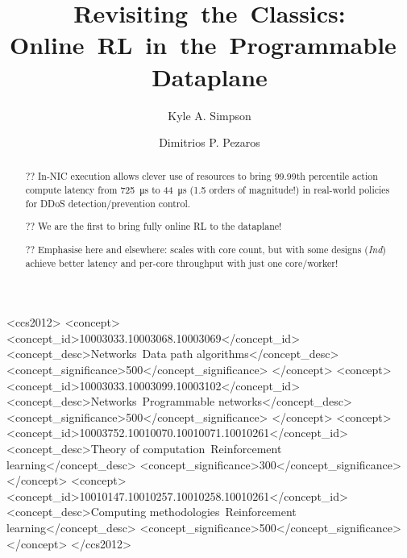 \documentclass[sigconf,natbib=false]{acmart}
\newcommand{\Indfw}{\emph{Ind}}
\begin{document}
	\title{Revisiting~the~Classics: Online~RL~in~the~Programmable~Dataplane}
	
	
	 \author{Kyle A. Simpson}
	 \author{Dimitrios P. Pezaros}
	
\renewcommand{\shortauthors}{Simpson \emph{et al}.}
	
\begin{abstract}
?? In-NIC execution allows clever use of resources to bring 99.99th percentile action compute latency  from \SI{725}{\micro\second} to \SI{44}{\micro\second} (1.5 orders of magnitude!) in real-world policies for DDoS detection/prevention control.

?? We are the first to bring fully online RL to the dataplane!

?? Emphasise here and elsewhere: scales with core count, but with some designs (\Indfw) achieve better latency and per-core throughput with just one core/worker!
\end{abstract}

\begin{CCSXML}
	<ccs2012>
	<concept>
	<concept_id>10003033.10003068.10003069</concept_id>
	<concept_desc>Networks~Data path algorithms</concept_desc>
	<concept_significance>500</concept_significance>
	</concept>
	<concept>
	<concept_id>10003033.10003099.10003102</concept_id>
	<concept_desc>Networks~Programmable networks</concept_desc>
	<concept_significance>500</concept_significance>
	</concept>
	<concept>
	<concept_id>10003752.10010070.10010071.10010261</concept_id>
	<concept_desc>Theory of computation~Reinforcement learning</concept_desc>
	<concept_significance>300</concept_significance>
	</concept>
	<concept>
	<concept_id>10010147.10010257.10010258.10010261</concept_id>
	<concept_desc>Computing methodologies~Reinforcement learning</concept_desc>
	<concept_significance>500</concept_significance>
	</concept>
	</ccs2012>
\end{CCSXML}

\end{document}
